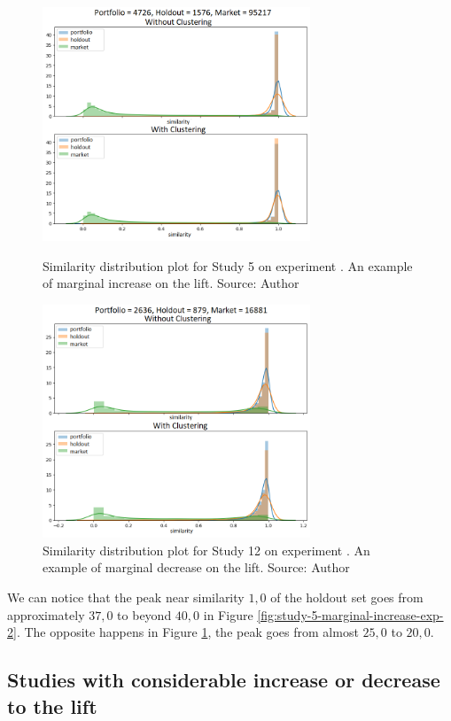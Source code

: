\begin{figure}[!ht]
   \centering
   \includegraphics[width=8cm]{fig/ch4-study-5-marginal-increase-exp-2.png}
   \caption{Similarity distribution plot for Study 5 on experiment \nameExperimentII{}. An example of marginal increase on the lift. Source: Author}
   \label{fig:study-5-marginal-increase-exp-2}

   \includegraphics[width=8cm]{fig/ch4-study-12-marginal-decrease-exp-1.png}
   \caption{Similarity distribution plot for Study 12 on experiment \nameExperimentI{}. An example of marginal decrease on the lift. Source: Author}
   \label{fig:study-12-marginal-decrease-exp-1}
\end{figure}

We can notice that the peak near similarity $1,0$ of the holdout set goes from approximately $37,0$ to beyond $40,0$ in Figure \ref{fig:study-5-marginal-increase-exp-2}. The opposite happens in Figure \ref{fig:study-12-marginal-decrease-exp-1}, the peak goes from almost $25,0$ to $20,0$.

\subsection{Studies with considerable increase or decrease to the lift}
\label{ch:considerable-change}

